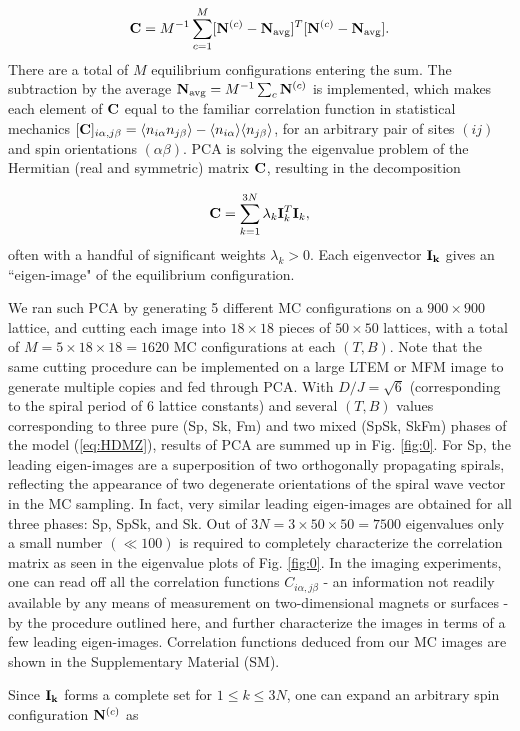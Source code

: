 \documentclass[reprint,amsmath,amssymb,aps,showpacs,superscriptaddress,prl]{revtex4-1}
\newcommand{\ba}{\begin{eqnarray}}
\newcommand{\ea}{\end{eqnarray}}
\renewcommand{\v}[1]{{\bf #1}}
\begin{document}
\ba {\bf C} = M^{-1} \sum_{c=1}^M [ \v N^{(c)} - \v N_{\rm avg} ]^T  [ \v N^{(c)} - \v N_{\rm avg} ] . \ea
There are a total of $M$ equilibrium configurations entering the sum. The subtraction by the average $\v N_{\rm avg} = M^{-1} \sum_c \v N^{(c)}$ is implemented, which makes each element of ${\bf C}$ equal to the familiar correlation function in statistical mechanics $[ {\bf C} ]_{i \alpha, j \beta} = \langle n_{i\alpha} n_{j\beta} \rangle - \langle n_{i\alpha} \rangle \langle n_{j\beta} \rangle$,
for an arbitrary pair of sites $(ij)$ and spin orientations $(\alpha\beta)$. PCA is solving the eigenvalue problem of the Hermitian (real and symmetric) matrix ${\bf C}$, resulting in the decomposition

\ba {\bf C} = \sum_{k=1}^{3N} \lambda_k \v I_k^T \v I_k  , \label{eq:PCA} \ea
often with a handful of significant weights $\lambda_k > 0$. Each eigenvector $\bf I_k$ gives an ``eigen-image" of the equilibrium configuration.

We ran such PCA by generating 5 different MC configurations on a $900\times 900$ lattice, and cutting each image into $18\times18$ pieces of $50\times50$ lattices, with a total of $M = 5 \times 18\times 18 = 1620$ MC configurations at each $(T,B)$. Note that the same cutting procedure can be implemented on a large LTEM or MFM image to generate multiple copies and fed through PCA. With $D/J=\sqrt{6}$ (corresponding to the spiral period of 6 lattice constants) and several $(T,B)$ values corresponding to three pure (Sp, Sk, Fm) and two mixed (SpSk, SkFm) phases of the model (\ref{eq:HDMZ}), results of PCA are summed up in Fig. \ref{fig:0}. For Sp, the leading eigen-images are a superposition of two orthogonally propagating spirals, reflecting the appearance of two degenerate orientations of the spiral wave vector in the MC sampling. In fact, very similar leading eigen-images are obtained for all three phases: Sp, SpSk, and Sk. Out of $3N=3\times 50\times 50=7500$ eigenvalues only a small number $(\ll 100)$ is required to completely characterize the correlation matrix as seen in the eigenvalue plots of Fig. \ref{fig:0}. In the imaging experiments, one can read off all the correlation functions $C_{i\alpha, j\beta}$ - an information not readily available by any means of measurement on two-dimensional magnets or surfaces - by the procedure outlined here, and further characterize the images in terms of a few leading eigen-images. Correlation functions deduced from our MC images are shown in the Supplementary Material (SM).

Since $\bf I_k$ forms a complete set for $1 \le k \le 3N$, one can expand an arbitrary spin configuration $\v N^{(c)}$ as
\end{document}
